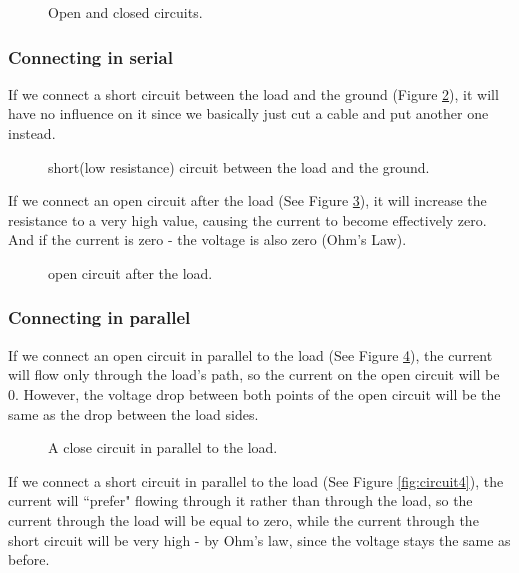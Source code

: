 \begin{figure}[!ht]
    \centering
    
    \caption{Open and closed circuits.} \label{fig:open_closed_circuits}
\end{figure}

\subsubsection{Connecting in serial}

If we connect a short circuit between the load and the ground (Figure
\ref{fig:circuit1}), it will have no influence on it since we basically just
cut a cable and put another one instead.

\begin{figure}[!ht]
    \centering
    
    \caption{short(low resistance) circuit between the load and the ground.} \label{fig:circuit1}
\end{figure}

If we connect an open circuit after the load (See Figure \ref{fig:circuit2}), it
will increase the resistance to a very high value, causing the current to become
effectively zero. And if the current is zero - the voltage is also zero (Ohm's
Law).

\begin{figure}[!ht]
    \centering
    
    \caption{open circuit after the load.} \label{fig:circuit2}
\end{figure}

\subsubsection{Connecting in parallel}

If we connect an open circuit in parallel to the load (See Figure
\ref{fig:circuit3}), the current will flow only through the load's path, so the
current on the open circuit will be 0. However, the voltage drop between both
points of the open circuit will be the same as the drop between the load sides.

\begin{figure}[!ht]
    \centering
    
    \caption{A close circuit in parallel to the load.} \label{fig:circuit3}
\end{figure}

If we connect a short circuit in parallel to the load (See Figure
\ref{fig:circuit4}), the current will ``prefer" flowing through it rather than
through the load, so the current through the load will be equal to zero, while
the current through the short circuit will be very high - by Ohm's law, since the voltage stays the same as before.

